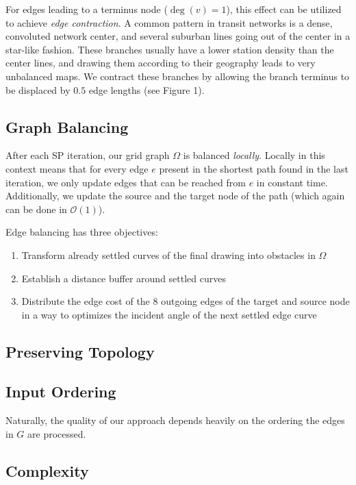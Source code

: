 \documentclass{sig-alternate-sigmod09}
\begin{document}
For edges leading to a terminus node ($\deg(v) = 1$), this effect can be utilized to achieve \emph{edge contraction}. A common pattern in transit networks is a dense, convoluted network center, and several suburban lines going out of the center in a star-like fashion. These branches usually have a lower station density than the center lines, and drawing them according to their geography leads to very unbalanced maps. We contract these branches by allowing the branch terminus to be displaced by $0.5$ edge lengths (see Figure 1).

\subsection{Graph Balancing}
\label{SEC:balancing}

After each SP iteration, our grid graph $\Omega$ is balanced \emph{locally}. Locally in this context means that for every edge $e$ present in the shortest path found in the last iteration, we only update edges that can be reached from $e$ in constant time. Additionally, we update the source and the target node of the path (which again can be done in $\mathcal{O}(1)$).

Edge balancing has three objectives:

\begin{enumerate}
\item Transform already settled curves of the final drawing into obstacles in $\Omega$
\item Establish a distance buffer around settled curves
\item Distribute the edge cost of the 8 outgoing edges of the target and source node in a way to optimizes the incident angle of the next settled edge curve
\end{enumerate}

\subsection{Preserving Topology}

\subsection{Input Ordering}

Naturally, the quality of our approach depends heavily on the ordering the edges in $G$ are processed.


\subsection{Complexity}
\end{document}

